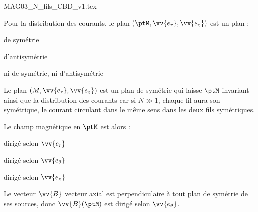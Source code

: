 \begin{center}
{MAG03_N_fils_CBD_v1.tex}
\end{center}                                         

% 
                               \finalisationDuPartageDePage %


\begin{enonce}
Pour la distribution des courants, le plan $(\ptM,\vv{e_r},\vv{e_z})$ est un plan :
	\begin{listeQCM2Colonnes}
		\item de symétrie
		\item d'antisymétrie
		\item ni de symétrie, ni d'antisymétrie
	\end{listeQCM2Colonnes}
\end{enonce}

\reponse{$\reponseA{}$}

\begin{corrige}
Le plan $(M, \vv{e_r}, \vv{e_z})$ est un plan de symétrie qui laisse $\ptM$ invariant ainsi que la distribution des courants car si $N\gg1$, chaque fil aura son symétrique, le courant circulant dans le même sens dans les deux fils symétriques.
\end{corrige}



\begin{enonce}
Le champ magnétique en $\ptM$ est alors :
	\begin{listeQCM2Colonnes}
		\item dirigé selon $\vv{e_r}$
		\item dirigé selon $\vv{e_\theta}$
		\item dirigé selon $\vv{e_z}$
	\end{listeQCM2Colonnes}
\end{enonce}


\reponse{$\reponseB{}$}

\begin{corrige} 
Le vecteur $\vv{B}$ vecteur axial est perpendiculaire à tout plan de symétrie de ses sources, donc $\vv{B}(\ptM)$ est dirigé selon $\vv{e_\theta}$.
\end{corrige}

